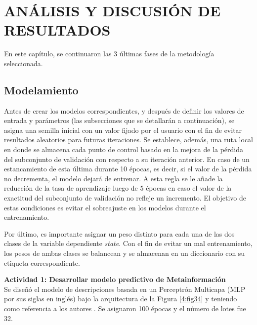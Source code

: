 \chapter{ANÁLISIS Y DISCUSIÓN DE RESULTADOS}
En este capítulo, se continuaron las 3 últimas fases de la metodología seleccionada.

\section{Modelamiento}
Antes de crear los modelos correspondientes, y después de definir los valores de entrada y parámetros (las subsecciones que se detallarán a continuación), se asigna una semilla inicial con un valor fijado por el usuario con el fin de evitar resultados aleatorios para futuras iteraciones. Se establece, además, una ruta local en donde se almacena cada punto de control basado en la mejora de la pérdida del subconjunto de validación con respecto a su iteración anterior. En caso de un estancamiento de esta última durante 10 épocas, es decir, si el valor de la pérdida no decrementa, el modelo dejará de entrenar. A esta regla se le añade la reducción de la tasa de aprendizaje luego de 5 épocas en caso el valor de la exactitud del subconjunto de validación no refleje un incremento. El objetivo de estas condiciones es evitar el sobreajuste en los modelos durante el entrenamiento.

Por último, es importante asignar un peso distinto para cada una de las dos clases de la variable dependiente \textit{state}. Con el fin de evitar un mal entrenamiento, los pesos de ambas clases se balancean y se almacenan en un diccionario con su etiqueta correspondiente.

\textbf{Actividad 1: Desarrollar modelo predictivo de Metainformación}
\\
Se diseñó el modelo de descripciones basada en un Perceptrón Multicapa (MLP por sus siglas en inglés) bajo la arquitectura de la Figura \ref{4:fig34} y teniendo como referencia a los autores \citeauthor{pr_yu2018deeplearning}. Se asignaron 100 épocas y el número de lotes fue 32.

